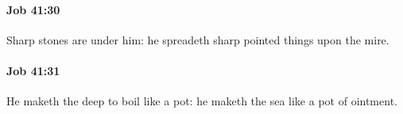 		\paragraph{Job 41:30} %
			\label{JOB-41-30}

			Sharp stones are under him: he spreadeth sharp pointed things upon the mire.


		\paragraph{Job 41:31} %
			\label{JOB-41-31}

			He maketh the deep to boil like a pot: he maketh the sea like a pot of ointment.


